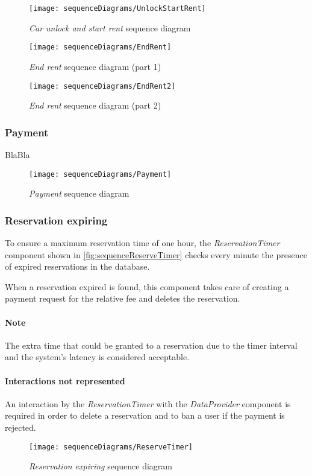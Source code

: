 \begin{figure}[h!]
	\centering
	\texttt{[image: sequenceDiagrams/UnlockStartRent]}
	\caption{
		\label{fig:sequenceUnlockStartRent} 
		\emph{Car unlock and start rent} sequence diagram
	}
\end{figure}
\begin{figure}[h!]
	\centering
	\texttt{[image: sequenceDiagrams/EndRent]}
	\caption{
		\label{fig:sequenceEndRent1} 
		\emph{End rent} sequence diagram (part 1)
	}
\end{figure}
\begin{figure}[h!]
	\centering
	\texttt{[image: sequenceDiagrams/EndRent2]}
	\caption{
		\label{fig:sequenceEndRent2} 
		\emph{End rent} sequence diagram (part 2)
	}
\end{figure}

\clearpage
\subsubsection{Payment}
BlaBla 
\begin{figure}[h!]
	\centering
	\texttt{[image: sequenceDiagrams/Payment]}
	\caption{
		\label{fig:sequencePayment} 
		\emph{Payment} sequence diagram
	}
\end{figure}

\clearpage
\subsubsection{Reservation expiring}
To ensure a maximum reservation time of one hour, the \emph{ReservationTimer} component shown in \autoref{fig:sequenceReserveTimer} checks every minute the presence of expired reservations in the database. 

When a reservation expired is found, this component takes care of creating a payment request for the relative fee and deletes the reservation. 

\paragraph{Note}The extra time that could be granted to a reservation due to the timer interval and the system's latency is considered acceptable.

\paragraph{Interactions not represented} An interaction by the \emph{ReservationTimer} with the \emph{DataProvider} component is required in order to delete a reservation and to ban a user if the payment is rejected.
\begin{figure}[h!]
	\centering
	\texttt{[image: sequenceDiagrams/ReserveTimer]}
	\caption{
		\label{fig:sequenceReserveTimer} 
		\emph{Reservation expiring} sequence diagram
	}
\end{figure}

